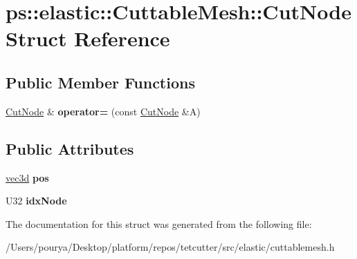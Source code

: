 \hypertarget{structps_1_1elastic_1_1CuttableMesh_1_1CutNode}{}\section{ps\+:\+:elastic\+:\+:Cuttable\+Mesh\+:\+:Cut\+Node Struct Reference}
\label{structps_1_1elastic_1_1CuttableMesh_1_1CutNode}
\subsection*{Public Member Functions}
\begin{DoxyCompactItemize}
\item 
\hypertarget{structps_1_1elastic_1_1CuttableMesh_1_1CutNode_af1d8c1bf9db5ec6fe0ceb91c49eaa9f0}{}\hyperlink{structps_1_1elastic_1_1CuttableMesh_1_1CutNode}{Cut\+Node} \& {\bfseries operator=} (const \hyperlink{structps_1_1elastic_1_1CuttableMesh_1_1CutNode}{Cut\+Node} \&A)\label{structps_1_1elastic_1_1CuttableMesh_1_1CutNode_af1d8c1bf9db5ec6fe0ceb91c49eaa9f0}

\end{DoxyCompactItemize}
\subsection*{Public Attributes}
\begin{DoxyCompactItemize}
\item 
\hypertarget{structps_1_1elastic_1_1CuttableMesh_1_1CutNode_a5eaae40ce191a0d4099db72509a89a9b}{}\hyperlink{classps_1_1base_1_1Vec3}{vec3d} {\bfseries pos}\label{structps_1_1elastic_1_1CuttableMesh_1_1CutNode_a5eaae40ce191a0d4099db72509a89a9b}

\item 
\hypertarget{structps_1_1elastic_1_1CuttableMesh_1_1CutNode_acf42abfbd5ad29d74dc68bd620332a04}{}U32 {\bfseries idx\+Node}\label{structps_1_1elastic_1_1CuttableMesh_1_1CutNode_acf42abfbd5ad29d74dc68bd620332a04}

\end{DoxyCompactItemize}


The documentation for this struct was generated from the following file\+:\begin{DoxyCompactItemize}
\item 
/\+Users/pourya/\+Desktop/platform/repos/tetcutter/src/elastic/cuttablemesh.\+h\end{DoxyCompactItemize}

